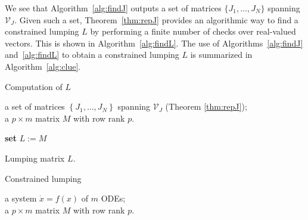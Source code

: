 {	We see that Algorithm~\ref{alg:findJ} outputs a set of matrices $\{ J_1,\dots, J_N\}$
	spanning $\mathcal{V}_{J}$.
	Given such a set, Theorem~\ref{thm:repJ} provides an algorithmic way to find a constrained lumping $L$ by performing a finite number of checks over real-valued vectors.
	This is shown in Algorithm~\ref{alg:findL}.
	The use of Algorithms~\ref{alg:findJ} and~\ref{alg:findL} to obtain a constrained lumping $L$ is summarized in Algorithm~\ref{alg:clue}.

	\hspace{-0.65cm}
	\begin{minipage}[t]{0.47\textwidth}
		\begin{algorithm}[H]
			\caption{\footnotesize Computation of $L$}\label{alg:findL}
			\scriptsize
			\begin{algorithmic}[1]
				\REQUIRE
				a set of matrices $\left\{ J_1,\dots,J_N \right\}$ spanning $\mathcal{V}_{J}$ (Theorem \ref{thm:repJ});\\
				a $p \times m$ matrix $M$ with row rank $p$.\label{alg:findL:M}

				\STATE \textbf{set} $L := M$
				\REPEAT
				 \label{alg:findL:check}
				\label{alg:findL:append}
				\ENDIF
				\ENDFOR

				\RETURN Lumping matrix $L$.
			\end{algorithmic}
		\end{algorithm}
		\vspace{0.01cm}
	\end{minipage}
	\hfill
	\begin{minipage}[t]{0.47\textwidth}
		\begin{algorithm}[H]
			\caption{\footnotesize Constrained lumping \cite{ovchinnikov_clue_2021} }\label{alg:clue}
			\algsetup{linenosize=\tiny}
			\scriptsize
			\begin{algorithmic}[1]
				\REQUIRE \!\!a\! system \!$\dot{x} \!=\!\! f(x)\!$ of $\!m\!$ \! ODEs;\\
				a $p \times m$ matrix $M$ with row rank $p$.\\


\end{algorithmic}
\end{algorithm}
\end{minipage}}
